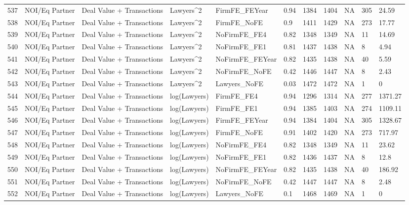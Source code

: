 \documentclass{article}
\begin{document}
\begin{table}[H]
\begin{tabular}{rllllllllll}
  537 & NOI/Eq Partner & Deal Value + Transactions & Lawyers^2 & FirmFE\_FEYear & 0.94 & 1384 & 1404 & NA & 305 & 24.59 \\ 
  538 & NOI/Eq Partner & Deal Value + Transactions & Lawyers^2 & FirmFE\_NoFE & 0.9 & 1411 & 1429 & NA & 273 & 17.77 \\ 
  539 & NOI/Eq Partner & Deal Value + Transactions & Lawyers^2 & NoFirmFE\_FE4 & 0.82 & 1348 & 1349 & NA & 11 & 14.69 \\ 
  540 & NOI/Eq Partner & Deal Value + Transactions & Lawyers^2 & NoFirmFE\_FE1 & 0.81 & 1437 & 1438 & NA & 8 & 4.94 \\ 
  541 & NOI/Eq Partner & Deal Value + Transactions & Lawyers^2 & NoFirmFE\_FEYear & 0.82 & 1435 & 1438 & NA & 40 & 5.59 \\ 
  542 & NOI/Eq Partner & Deal Value + Transactions & Lawyers^2 & NoFirmFE\_NoFE & 0.42 & 1446 & 1447 & NA & 8 & 2.43 \\ 
  543 & NOI/Eq Partner & Deal Value + Transactions & Lawyers^2 & Lawyers\_NoFE & 0.03 & 1472 & 1472 & NA & 1 & 0 \\ 
  544 & NOI/Eq Partner & Deal Value + Transactions & log(Lawyers) & FirmFE\_FE4 & 0.94 & 1296 & 1314 & NA & 277 & 1371.27 \\ 
  545 & NOI/Eq Partner & Deal Value + Transactions & log(Lawyers) & FirmFE\_FE1 & 0.94 & 1385 & 1403 & NA & 274 & 1109.11 \\ 
  546 & NOI/Eq Partner & Deal Value + Transactions & log(Lawyers) & FirmFE\_FEYear & 0.94 & 1384 & 1404 & NA & 305 & 1328.67 \\ 
  547 & NOI/Eq Partner & Deal Value + Transactions & log(Lawyers) & FirmFE\_NoFE & 0.91 & 1402 & 1420 & NA & 273 & 717.97 \\ 
  548 & NOI/Eq Partner & Deal Value + Transactions & log(Lawyers) & NoFirmFE\_FE4 & 0.82 & 1348 & 1349 & NA & 11 & 23.62 \\ 
  549 & NOI/Eq Partner & Deal Value + Transactions & log(Lawyers) & NoFirmFE\_FE1 & 0.82 & 1436 & 1437 & NA & 8 & 12.8 \\ 
  550 & NOI/Eq Partner & Deal Value + Transactions & log(Lawyers) & NoFirmFE\_FEYear & 0.82 & 1435 & 1438 & NA & 40 & 186.92 \\ 
  551 & NOI/Eq Partner & Deal Value + Transactions & log(Lawyers) & NoFirmFE\_NoFE & 0.42 & 1447 & 1447 & NA & 8 & 2.48 \\ 
  552 & NOI/Eq Partner & Deal Value + Transactions & log(Lawyers) & Lawyers\_NoFE & 0.1 & 1468 & 1469 & NA & 1 & 0 \\ 

\end{tabular}
\end{table}
\end{document}
